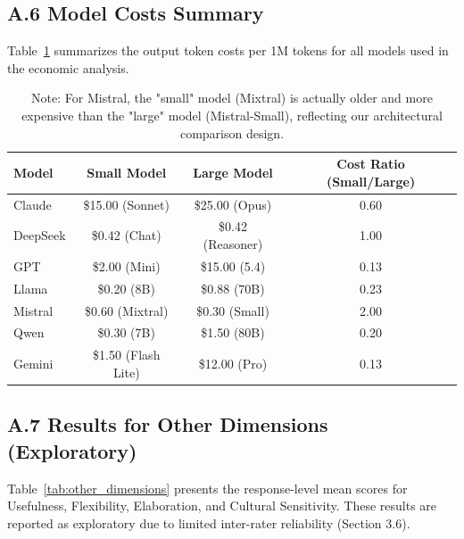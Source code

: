 \documentclass{article}
\begin{document}
\newpage
\subsection*{A.6 Model Costs Summary}

Table~\ref{tab:costs_full} summarizes the output token costs per 1M tokens for all models used in the economic analysis.

\begin{table}[H]
\centering
\caption{Model Costs Summary (Output Token Cost per 1M Tokens)}
\label{tab:costs_full}
\begin{tabular}{lccc}
\toprule
Model & Small Model & Large Model & Cost Ratio (Small/Large) \\
\midrule
Claude & \$15.00 (Sonnet) & \$25.00 (Opus) & 0.60 \\
DeepSeek & \$0.42 (Chat) & \$0.42 (Reasoner) & 1.00 \\
GPT & \$2.00 (Mini) & \$15.00 (5.4) & 0.13 \\
Llama & \$0.20 (8B) & \$0.88 (70B) & 0.23 \\
Mistral & \$0.60 (Mixtral) & \$0.30 (Small) & 2.00 \\
Qwen & \$0.30 (7B) & \$1.50 (80B) & 0.20 \\
Gemini & \$1.50 (Flash Lite) & \$12.00 (Pro) & 0.13 \\
\bottomrule
\end{tabular}
\caption*{\footnotesize Note: For Mistral, the "small" model (Mixtral) is actually older and more expensive than the "large" model (Mistral-Small), reflecting our architectural comparison design.}
\end{table}

\newpage
\subsection*{A.7 Results for Other Dimensions (Exploratory)}

Table~\ref{tab:other_dimensions} presents the response-level mean scores for Usefulness, Flexibility, Elaboration, and Cultural Sensitivity. These results are reported as exploratory due to limited inter-rater reliability (Section 3.6).
\end{document}
